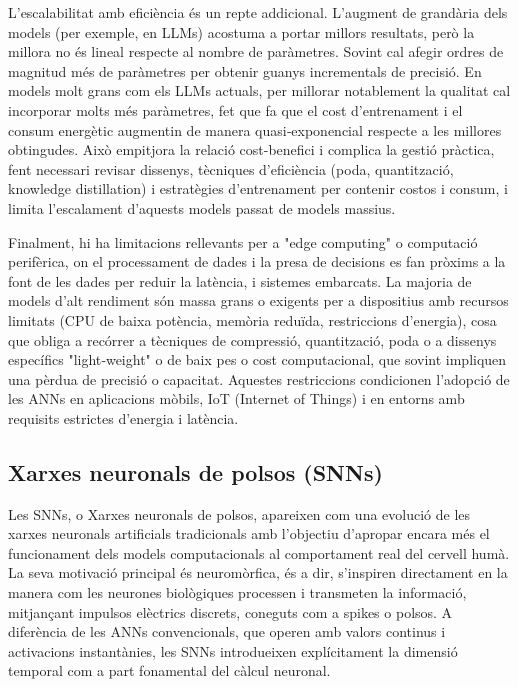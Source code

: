 \documentclass[a4paper,11pt, titlepage, twoside]{article}
\begin{document}
L'escalabilitat amb eficiència és un repte addicional. L'augment de grandària dels models (per exemple, en LLMs) acostuma a portar millors resultats, però la millora no és lineal respecte al nombre de paràmetres. Sovint cal afegir ordres de magnitud més de paràmetres per obtenir guanys incrementals de precisió. En models molt grans com els LLMs actuals, per millorar notablement la qualitat cal incorporar molts més paràmetres, fet que fa que el cost d'entrenament i el consum energètic augmentin de manera quasi‑exponencial respecte a les millores obtingudes. Això empitjora la relació cost-benefici i complica la gestió pràctica, fent necessari revisar dissenys, tècniques d'eficiència (poda, quantització, knowledge distillation) i estratègies d'entrenament per contenir costos i consum, i limita l'escalament d'aquests models passat de models massius.

Finalment, hi ha limitacions rellevants per a "edge computing" o computació perifèrica, on el processament de dades i la presa de decisions es fan pròxims a la font de les dades per reduir la latència, i sistemes embarcats. La majoria de models d'alt rendiment són massa grans o exigents per a dispositius amb recursos limitats (CPU de baixa potència, memòria reduïda, restriccions d'energia), cosa que obliga a recórrer a tècniques de compressió, quantització, poda o a dissenys específics "light‑weight" o de baix pes o cost computacional, que sovint impliquen una pèrdua de precisió o capacitat. Aquestes restriccions condicionen l'adopció de les ANNs en aplicacions mòbils, IoT (Internet of Things) i en entorns amb requisits estrictes d'energia i latència.

\subsection{Xarxes neuronals de polsos (SNNs)}
Les SNNs, o Xarxes neuronals de polsos, apareixen com una evolució de les xarxes neuronals artificials tradicionals amb l'objectiu d'apropar encara més el funcionament dels models computacionals al comportament real del cervell humà. La seva motivació principal és neuromòrfica, és a dir, s'inspiren directament en la manera com les neurones biològiques processen i transmeten la informació, mitjançant impulsos elèctrics discrets, coneguts com a spikes o polsos. A diferència de les ANNs convencionals, que operen amb valors continus i activacions instantànies, les SNNs introdueixen explícitament la dimensió temporal com a part fonamental del càlcul neuronal.
\end{document}

